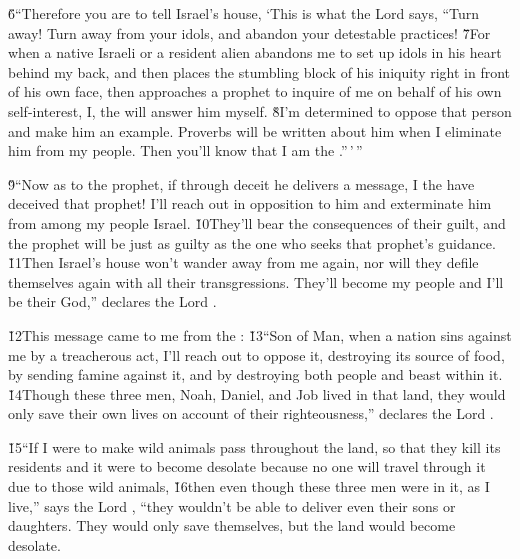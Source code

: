 \v{6}``Therefore you are to tell Israel's house, `This is what the Lord  says, ``Turn away! Turn away from your idols, and abandon your detestable practices! \v{7}For when a native Israeli or a resident alien abandons me to set up idols in his heart behind my back, and then places the stumbling block of his iniquity right in front of his own face, then approaches a prophet to inquire of me on behalf of his own self-interest, I, the  will answer him myself. \v{8}I'm determined to oppose that person and make him an example. Proverbs will be written about him when I eliminate him from my people. Then you'll know that I am the .''\,'\,''

\v{9}``Now as to the prophet, if through deceit he delivers a message, I the  have deceived that prophet! I'll reach out in opposition to him and exterminate him from among my people Israel. \v{10}They'll bear the consequences of their guilt, and the prophet will be just as guilty as the one who seeks that prophet's guidance. \v{11}Then Israel's house won't wander away from me again, nor will they defile themselves again with all their transgressions. They'll become my people and I'll be their God,'' declares the Lord .

\v{12}This message came to me from the : \v{13}``Son of Man, when a nation sins against me by a treacherous act, I'll reach out to oppose it, destroying its source of food, by sending famine against it, and by destroying both people and beast within it. \v{14}Though these three men, Noah, Daniel, and Job lived in that land, they would only save their own lives on account of their righteousness,'' declares the Lord .

\v{15}``If I were to make wild animals pass throughout the land, so that they kill its residents and it were to become desolate because no one will travel through it due to those wild animals, \v{16}then even though these three men were in it, as I live,'' says the Lord , ``they wouldn't be able to deliver even their sons or daughters. They would only save themselves, but the land would become desolate.

